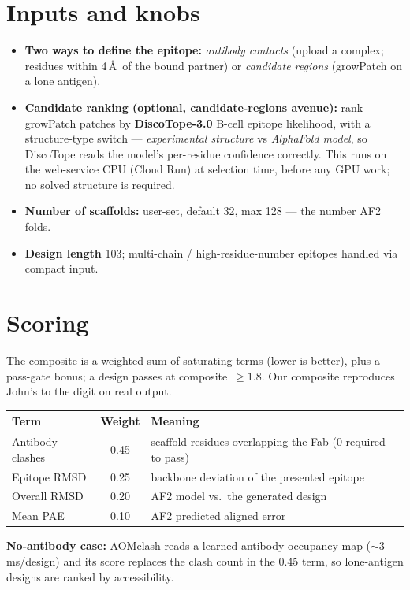 \documentclass[11pt]{article}
\begin{document}
\section*{Inputs and knobs}
\begin{itemize}
  \item \textbf{Two ways to define the epitope:} \emph{antibody contacts} (upload a complex; residues
        within 4\,\AA\ of the bound partner) or \emph{candidate regions} (growPatch on a lone antigen).
  \item \textbf{Candidate ranking (optional, candidate-regions avenue):} rank growPatch patches by
        \textbf{DiscoTope-3.0} B-cell epitope likelihood, with a structure-type switch ---
        \emph{experimental structure} vs \emph{AlphaFold model}, so DiscoTope reads the model's
        per-residue confidence correctly. This runs on the web-service CPU (Cloud Run) at selection
        time, before any GPU work; no solved structure is required.
  \item \textbf{Number of scaffolds:} user-set, default 32, max 128 --- the number AF2 folds.
  \item \textbf{Design length} 103; multi-chain / high-residue-number epitopes handled via compact input.
\end{itemize}

\section*{Scoring}
The composite is a weighted sum of saturating terms (lower-is-better), plus a pass-gate bonus; a design
passes at composite~$\ge 1.8$. Our composite reproduces John's to the digit on real output.

\begin{center}\footnotesize
\begin{tabular}{@{}lcl@{}}
\toprule
\textbf{Term} & \textbf{Weight} & \textbf{Meaning}\\
\midrule
Antibody clashes & 0.45 & scaffold residues overlapping the Fab (0 required to pass)\\
Epitope RMSD & 0.25 & backbone deviation of the presented epitope\\
Overall RMSD & 0.20 & AF2 model vs.\ the generated design\\
Mean PAE & 0.10 & AF2 predicted aligned error\\
\bottomrule
\end{tabular}
\end{center}
\textbf{No-antibody case:} AOMclash reads a learned antibody-occupancy map ($\sim$3\,ms/design) and its
score replaces the clash count in the 0.45 term, so lone-antigen designs are ranked by accessibility.
\end{document}
